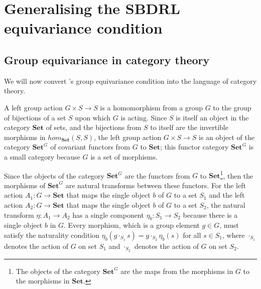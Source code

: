 \section{Generalising the SBDRL equivariance condition}

\subsection{Group equivariance in category theory}\label{sec:Group equivariance in category theory}

We will now convert \autocite{Higgins2018}'s group equivariance condition into the language of category theory.

A left group action $G \times S \to S$ is a homomorphism from a group $G$ to the group of bijections of a set $S$ upon which $G$ is acting.
Since $S$ is itself an object in the category $\textbf{Set}$ of sets, and the bijections from $S$ to itself are the invertible morphisms in $hom_{\textbf{Set}}(S, S)$, the left group action $G \times S \to S$ is an object of the category $\textbf{Set}^{G}$ of covariant functors from $G$ to $\textbf{Set}$; this functor category $\textbf{Set}^{G}$ is a small category because $G$ is a set of morphisms.

Since the objects of the category $\textbf{Set}^{G}$ are the functors from $G$ to $\textbf{Set}$\footnote{The objects of the category $\textbf{Set}^{G}$ are the maps from the morphisms in $G$ to the morphisms in $\textbf{Set}$.}, then the morphisms of $\textbf{Set}^{G}$ are natural transforms between these functors.
For the left action $A_1: G \to \textbf{Set}$ that maps the single object $b$ of $G$ to a set $S_1$ and the left action $A_2: G \to \textbf{Set}$ that maps the single object $b$ of $G$ to a set $S_2$, the natural transform $\eta : A_1 \to A_2$ has a single component $\eta_{b} : S_1 \to S_2$ because there is a single object $b$ in $G$.
Every morphism, which is a group element $g \in G$, must satisfy the naturality condition $\eta_{b}(g \cdot_{S_1} s) = g \cdot_{S_2} \eta_{b}(s)$ for all $s \in S_1$, where $\cdot_{S_1}$ denotes the action of $G$ on set $S_1$ and $\cdot_{S_2}$ denotes the action of $G$ on set $S_2$.

